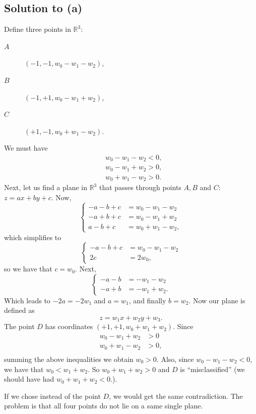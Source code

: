 \documentclass[10pt]{article}
\begin{document}
\subsection*{Solution to (a)}
Define three points in $\mathbb{R}^3$:
\begin{description}
\item[$A$] $(-1, -1, w_0 - w_1 - w_2)$,
\item[$B$] $(-1, +1, w_0 - w_1 + w_2)$,
\item[$C$] $(+1, -1, w_0 + w_1 - w_2)$.
\end{description}
We must have
\begin{align*}
& w_0 - w_1 - w_2 < 0, \\
& w_0 - w_1 + w_2 > 0, \\
& w_0 + w_1 - w_2 > 0.
\end{align*}
Next, let us find a plane in $\mathbb{R}^3$ that passes through points $A, B$ and $C$: $z = ax + by + c$. Now,
\[
\begin{cases}
-a - b + c &= w_0 - w_1 - w_2 \\
-a + b + c &= w_0 - w_1 + w_2 \\
a - b + c  &= w_0 + w_1 - w_2,
\end{cases}
\]
which simplifies to
\[
\begin{cases}
-a - b + c &= w_0 - w_1 - w_2 \\
2c &= 2w_0,
\end{cases}
\]
so we have that $c = w_0$. Next,
\[
\begin{cases}
-a - b &= -w_1 - w_2 \\
-a + b & = -w_1 + w_2.
\end{cases}
\]
Which leads to $-2a = -2w_1$ and $a = w_1$, and finally $b = w_2$. Now our plane is defined as
\[
z = w_1x + w_2y + w_3.
\]
The point $D$ has coordinates $(+1, +1, w_0 + w_1 + w_2)$. Since
\begin{align*}
w_0 - w_1 + w_2 &> 0 \\
w_0 + w_1 - w_2 &> 0, \\
\end{align*}
summing the above inequalities we obtain $w_0 > 0$. Also, since $w_0 - w_1 - w_2 < 0$, we have that $w_0 < w_1 + w_2$. So $w_0 + w_1 + w_2 > 0$ and $D$ is ``misclassified'' (we should have had $w_0 + w_1 + w_2 < 0$.). 

If we chose instead of the point $D$, we would get the same contradiction. The problem is that all four points do not lie on a same single plane.
\end{document}
